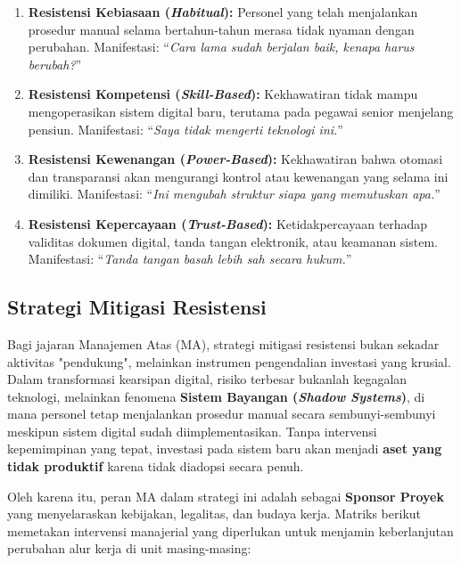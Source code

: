 \documentclass[12pt,a4paper]{report}
\begin{document}
\begin{enumerate}[leftmargin=*]
    \item \textbf{Resistensi Kebiasaan (\textit{Habitual}):} Personel yang telah menjalankan prosedur manual selama bertahun-tahun merasa tidak nyaman dengan perubahan. Manifestasi: ``\textit{Cara lama sudah berjalan baik, kenapa harus berubah?}''
    \item \textbf{Resistensi Kompetensi (\textit{Skill-Based}):} Kekhawatiran tidak mampu mengoperasikan sistem digital baru, terutama pada pegawai senior menjelang pensiun. Manifestasi: ``\textit{Saya tidak mengerti teknologi ini.}''
    \item \textbf{Resistensi Kewenangan (\textit{Power-Based}):} Kekhawatiran bahwa otomasi dan transparansi akan mengurangi kontrol atau kewenangan yang selama ini dimiliki. Manifestasi: ``\textit{Ini mengubah struktur siapa yang memutuskan apa.}''
    \item \textbf{Resistensi Kepercayaan (\textit{Trust-Based}):} Ketidakpercayaan terhadap validitas dokumen digital, tanda tangan elektronik, atau keamanan sistem. Manifestasi: ``\textit{Tanda tangan basah lebih sah secara hukum.}''
\end{enumerate}

\subsection{Strategi Mitigasi Resistensi}
Bagi jajaran Manajemen Atas (MA), strategi mitigasi resistensi bukan sekadar aktivitas "pendukung", melainkan instrumen pengendalian investasi yang krusial. Dalam transformasi kearsipan digital, risiko terbesar bukanlah kegagalan teknologi, melainkan fenomena \textbf{Sistem Bayangan (\textit{Shadow Systems})}, di mana personel tetap menjalankan prosedur manual secara sembunyi-sembunyi meskipun sistem digital sudah diimplementasikan. Tanpa intervensi kepemimpinan yang tepat, investasi pada sistem baru akan menjadi \textbf{aset yang tidak produktif} karena tidak diadopsi secara penuh.

Oleh karena itu, peran MA dalam strategi ini adalah sebagai \textbf{Sponsor Proyek} yang menyelaraskan kebijakan, legalitas, dan budaya kerja. Matriks berikut memetakan intervensi manajerial yang diperlukan untuk menjamin keberlanjutan perubahan alur kerja di unit masing-masing:
\end{document}
